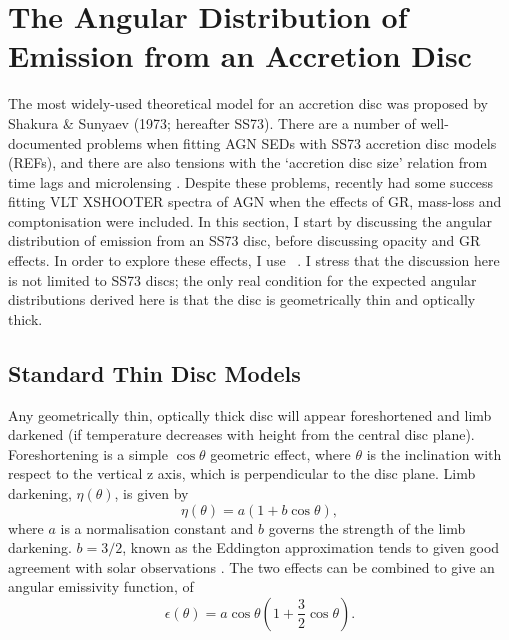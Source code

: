 \section{The Angular Distribution of Emission from an Accretion Disc}
\label{sec:disc_agn}

\noindent 
The most widely-used theoretical model for an accretion disc
was proposed by Shakura \& Sunyaev (1973; hereafter SS73). 
\nocite{shakurasunyaev1973}
There are a number of well-documented problems when fitting 
AGN SEDs with SS73 accretion disc models (REFs), and there are also 
tensions with the `accretion disc size' relation from time lags \citep{edelson2015}
and microlensing \citep{morgan2010}. Despite these problems, 
\cite{capellupo2015} recently had 
some success fitting VLT XSHOOTER spectra of AGN when the effects of
GR, mass-loss and comptonisation were included.
In this section, I start by discussing the angular distribution of
emission from an SS73 disc, before discussing opacity and GR 
effects. In order to explore these effects, I use \agn\
\citep{hubeny2000,davishubeny2006,davis2007}. I stress that the 
discussion here is not limited to SS73 discs; the only real condition
for the expected angular distributions derived here is that the 
disc is geometrically thin and optically thick.

\subsection{Standard Thin Disc Models}

\noindent
Any geometrically thin, optically thick disc will appear
foreshortened and limb darkened (if temperature decreases
with height from the central disc plane). 
Foreshortening is a simple $\cos \theta$ geometric effect, 
where $\theta$ is the inclination with respect to the vertical z axis, which
is perpendicular to the disc plane.
Limb darkening, $\eta(\theta)$, is given by
\begin{equation}
\eta(\theta) = a \left( 1 + b \cos \theta \right),
\end{equation}
where $a$ is a normalisation constant and $b$ governs the strength
of the limb darkening. $b=3/2$, known as the Eddington approximation
tends to given good agreement with solar observations 
\citep[e.g.][]{mihalas}. The two effects can be 
combined to give an angular emissivity function, of
\begin{equation}
\epsilon(\theta) = a \cos \theta \left( 1 + \frac{3}{2} \cos \theta \right).
\end{equation}

